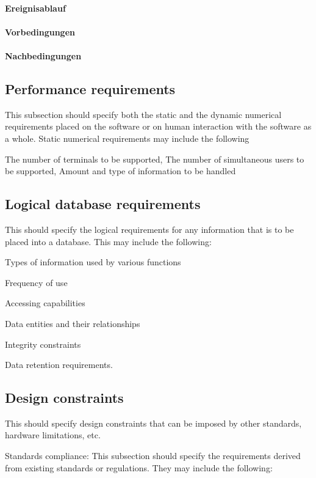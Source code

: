 			\paragraph{Ereignisablauf}
	
			\paragraph{Vorbedingungen}
			
			\paragraph{Nachbedingungen}
	
	\subsection{Performance requirements}
		This subsection should specify both the static and the dynamic numerical requirements placed on the software or on human interaction with the software as a whole. Static numerical requirements may include the following
		
		The number of terminals to be supported, The number of simultaneous users to be supported, Amount and type of information to be handled
		
	\subsection{Logical database requirements}
		This should specify the logical requirements for any information that is to be placed into a database. This may include the following:
		
		Types of information used by various functions
		
		Frequency of use
		
		Accessing capabilities
		
		Data entities and their relationships
		
		Integrity constraints
		
		Data retention requirements.
	
	\subsection{Design constraints}
		This should specify design constraints that can be imposed by other standards, hardware limitations, etc.
		
		Standards compliance: This subsection should specify the requirements derived from existing standards or regulations. They may include the following: 
		
